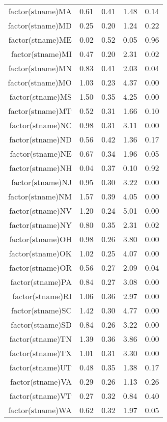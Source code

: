\begin{table}[ht]
\begin{tabular}{rrrrr}
  factor(stname)MA & 0.61 & 0.41 & 1.48 & 0.14 \\ 
  factor(stname)MD & 0.25 & 0.20 & 1.24 & 0.22 \\ 
  factor(stname)ME & 0.02 & 0.52 & 0.05 & 0.96 \\ 
  factor(stname)MI & 0.47 & 0.20 & 2.31 & 0.02 \\ 
  factor(stname)MN & 0.83 & 0.41 & 2.03 & 0.04 \\ 
  factor(stname)MO & 1.03 & 0.23 & 4.37 & 0.00 \\ 
  factor(stname)MS & 1.50 & 0.35 & 4.25 & 0.00 \\ 
  factor(stname)MT & 0.52 & 0.31 & 1.66 & 0.10 \\ 
  factor(stname)NC & 0.98 & 0.31 & 3.11 & 0.00 \\ 
  factor(stname)ND & 0.56 & 0.42 & 1.36 & 0.17 \\ 
  factor(stname)NE & 0.67 & 0.34 & 1.96 & 0.05 \\ 
  factor(stname)NH & 0.04 & 0.37 & 0.10 & 0.92 \\ 
  factor(stname)NJ & 0.95 & 0.30 & 3.22 & 0.00 \\ 
  factor(stname)NM & 1.57 & 0.39 & 4.05 & 0.00 \\ 
  factor(stname)NV & 1.20 & 0.24 & 5.01 & 0.00 \\ 
  factor(stname)NY & 0.80 & 0.35 & 2.31 & 0.02 \\ 
  factor(stname)OH & 0.98 & 0.26 & 3.80 & 0.00 \\ 
  factor(stname)OK & 1.02 & 0.25 & 4.07 & 0.00 \\ 
  factor(stname)OR & 0.56 & 0.27 & 2.09 & 0.04 \\ 
  factor(stname)PA & 0.84 & 0.27 & 3.08 & 0.00 \\ 
  factor(stname)RI & 1.06 & 0.36 & 2.97 & 0.00 \\ 
  factor(stname)SC & 1.42 & 0.30 & 4.77 & 0.00 \\ 
  factor(stname)SD & 0.84 & 0.26 & 3.22 & 0.00 \\ 
  factor(stname)TN & 1.39 & 0.36 & 3.86 & 0.00 \\ 
  factor(stname)TX & 1.01 & 0.31 & 3.30 & 0.00 \\ 
  factor(stname)UT & 0.48 & 0.35 & 1.38 & 0.17 \\ 
  factor(stname)VA & 0.29 & 0.26 & 1.13 & 0.26 \\ 
  factor(stname)VT & 0.27 & 0.32 & 0.84 & 0.40 \\ 
  factor(stname)WA & 0.62 & 0.32 & 1.97 & 0.05 \\ 

\end{tabular}
\end{table}
